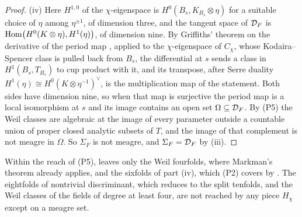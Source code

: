 \begin{proof}
(iv) Here $H^{1,0}$ of the $\chi$-eigenspace is $H^{0}(B_{s},K_{B_{s}}\otimes
\eta)$ for a suitable choice of $\eta$ among $\eta^{\pm1}$, of dimension
three, and the tangent space of $\mathcal{D}_{F}$ is
$\operatorname{Hom}\bigl(H^{0}(K\otimes\eta),H^{1}(\eta)\bigr)$, of dimension nine. By
Griffiths' theorem on the derivative of the period map \cite[Chapter~10]{Voi02},
applied to the $\chi$-eigenspace of $C_{\chi}$, whose Kodaira--Spencer class
is pulled back from $B_{s}$, the differential at $s$ sends a class in
$H^{1}(B_{s},T_{B_{s}})$ to cup product with it, and its
transpose, after Serre duality $H^{1}(\eta)\cong H^{0}(K\otimes\eta^{-1})^{\vee}$,
is the multiplication map of the statement. Both sides have dimension nine,
so when that map is surjective the period map is a local isomorphism at $s$
and its image contains an open set $\Omega\subseteq\mathcal{D}_{F}$. By (P5) the
Weil classes are algebraic at the image of every parameter outside a
countable union of proper closed analytic subsets of $T$, and the image of
that complement is not meagre in $\Omega$. So $\Sigma_{F}$ is not meagre, and
$\Sigma_{F}=\mathcal{D}_{F}$ by (iii).
\end{proof}

Within the reach of (P5),  leaves only the Weil
fourfolds, where Markman's theorem already applies, and the sixfolds of
part (iv), which (P2) covers by . The eightfolds of
nontrivial discriminant, which  reduces to the split
tenfolds, and the Weil classes of the fields of degree at least four, are not
reached by any piece $H_{\chi}$ except on a meagre set.

